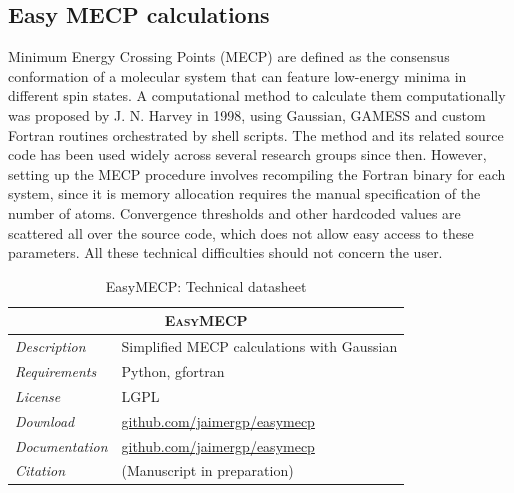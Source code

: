 \subsection{Easy MECP calculations}

Minimum Energy Crossing Points (MECP) are defined as the consensus conformation of a molecular system that can feature low-energy minima in different spin states. A computational method to calculate them computationally was proposed by J. N. Harvey in 1998,\cite{harvey1998} using Gaussian, GAMESS and custom Fortran routines orchestrated by shell scripts. The method and its related source code has been used widely across several research groups since then. However, setting up the MECP procedure involves recompiling the Fortran binary for each system, since it is memory allocation requires the manual specification of the number of atoms. Convergence thresholds and other hardcoded values are scattered all over the source code, which does not allow easy access to these parameters. All these technical difficulties should not concern the user.


\begin{table}[hbtp]
	\caption{EasyMECP: Technical datasheet}
	\footnotesize
	\newcommand{\tableheading}[1]{\multicolumn{2}{c}{\textsc{#1}}}
	\begin{tabularx}{\textwidth}{RL}
		\toprule
		\tableheading{EasyMECP}\\
		\toprule
		\textit{Description} & Simplified MECP calculations with Gaussian \\
		\midrule
		\textit{Requirements} & Python, gfortran \\
		\midrule
		\textit{License} & LGPL \\
		\midrule
		\textit{Download} & \href{https://github.com/jaimergp/easymecp}{github.com/jaimergp/easymecp} \\
		\midrule
		\textit{Documentation} & \href{https://github.com/jaimergp/easymecp}{github.com/jaimergp/easymecp} \\
		\midrule
		\textit{Citation} & (Manuscript in preparation) \\
		\bottomrule

	\end{tabularx}
\end{table}

